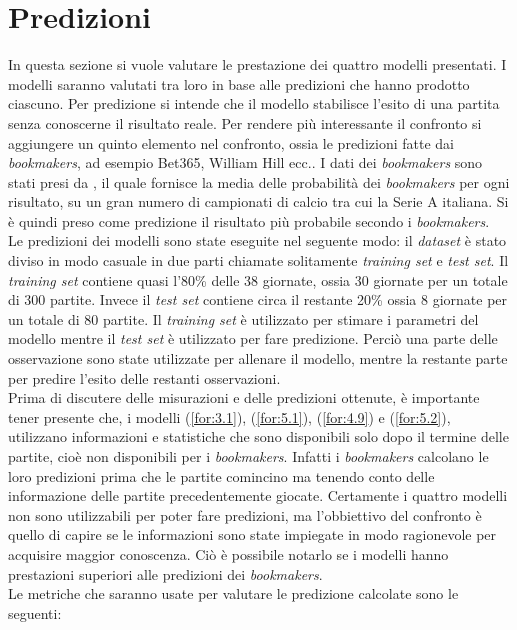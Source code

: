 \section{Predizioni}
In questa sezione si vuole valutare le prestazione dei quattro modelli presentati. I modelli saranno valutati tra loro in base alle predizioni che hanno prodotto ciascuno. Per predizione si intende che il modello stabilisce l'esito di una partita senza conoscerne il risultato reale. Per rendere più interessante il confronto si aggiungere un quinto elemento nel confronto, ossia le predizioni fatte dai \emph{bookmakers}, ad esempio Bet365, William Hill ecc.. I dati dei \emph{bookmakers} sono stati presi da \textit{\cite{bet}}, il quale fornisce la media delle probabilità dei \emph{bookmakers} per ogni risultato, su un gran numero di campionati di calcio tra cui la Serie A italiana. Si è quindi preso come predizione il risultato più probabile secondo i \emph{bookmakers}.\\
Le predizioni dei modelli sono state eseguite nel seguente modo: il \emph{dataset} è stato diviso in modo casuale in due parti chiamate solitamente \emph{training set} e \emph{test set}. Il \emph{training set} contiene quasi l'80\% delle 38 giornate, ossia 30 giornate per un totale di 300 partite. Invece il \emph{test set} contiene circa il restante 20\% ossia 8 giornate per un totale di 80 partite. Il \emph{training set} è utilizzato per stimare i parametri del modello mentre il \emph{test set} è utilizzato per fare predizione. Perciò una parte delle osservazione sono state utilizzate per allenare il modello, mentre la restante parte per predire l'esito delle restanti osservazioni. \\
Prima di discutere delle misurazioni e delle predizioni ottenute, è importante tener presente che, i modelli (\ref{for:3.1}), (\ref{for:5.1}), (\ref{for:4.9}) e (\ref{for:5.2}), utilizzano informazioni e statistiche che sono disponibili solo dopo il termine delle partite, cioè non disponibili per i \emph{bookmakers}. Infatti i \emph{bookmakers} calcolano le loro predizioni prima che le partite comincino ma tenendo conto delle informazione delle partite precedentemente giocate. Certamente i quattro modelli non sono utilizzabili per poter fare predizioni, ma l'obbiettivo del confronto è quello di capire se le informazioni sono state impiegate in modo ragionevole per acquisire maggior conoscenza. Ciò è possibile notarlo se i modelli hanno prestazioni superiori alle predizioni dei \emph{bookmakers}.\\
Le metriche che saranno usate per valutare le predizione calcolate sono le seguenti:
